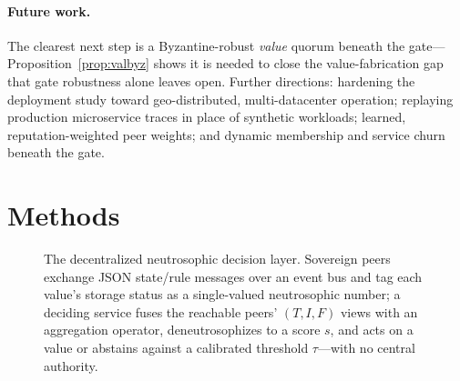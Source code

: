 \documentclass[fleqn,10pt]{wlscirep}
\begin{document}
\paragraph{Future work.} The clearest next step is a Byzantine-robust \emph{value} quorum beneath the
gate---Proposition~\ref{prop:valbyz} shows it is needed to close the value-fabrication gap that gate
robustness alone leaves open. Further directions: hardening the deployment study toward geo-distributed,
multi-datacenter operation; replaying production microservice traces in place of synthetic workloads;
learned, reputation-weighted peer weights; and dynamic membership and service churn beneath the gate.

\section{Methods}
\label{sec:methods}

\begin{figure}[t]
\centering
{}
\caption{The decentralized neutrosophic decision layer. Sovereign peers exchange JSON state/rule
messages over an event bus and tag each value's storage status as a single-valued neutrosophic number;
a deciding service fuses the reachable peers' $(T,I,F)$ views with an aggregation operator,
deneutrosophizes to a score $s$, and acts on a value or abstains against a calibrated threshold
$\tau$---with no central authority.}
\label{fig:system}
\end{figure}
\end{document}
